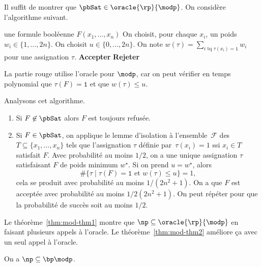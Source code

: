 \documentclass[./main]{subfiles}
\begin{document}
  \hspace{12pt}

  \begin{prv}
    Il suffit de montrer que $\pbSat \in \oracle{\rp}{\modp}$.
    On considère l'algorithme suivant.

    \begin{algorithmic}[1]
      \Require une formule booléenne $F(x_1, \ldots, x_n)$
      \State On choisit, pour chaque $x_i$, un poids $w_i \in \{1, \ldots, 2n\}$.
      \State On choisit $u \in \{0, \ldots, 2n\}$.
      \State On note $w(\tau) = \sum_{i \text{ tq } \tau(x_i) = \texttt{1}} w_i$ pour une assignation $\tau$.
      \BeginBox[draw=nicered]
      \State \textbf{Accepter}
      \Else
      \State \textbf{Rejeter}
      \EndIf
      \EndBox
    \end{algorithmic}
    La partie rouge utilise l'oracle pour $\modp$, car on peut vérifier en temps polynomial que $\tau(F) = \texttt{1}$ et que $w(\tau) \le u$.

    Analysons cet algorithme.
    \begin{enumerate}
      \item Si $F \not\in \pbSat$ alors $F$ est toujours refusée.
      \item Si  $F \in \pbSat$, on applique le lemme d'isolation à l'ensemble~$\mathcal{F}$ des $T \subseteq \{x_1, \ldots, x_n\}$ tels que l'assignation $\tau$ définie par~$\tau(x_i) = 1$ ssi $x_i \in T$ satisfait $F$.
        Avec probabilité au moins  $1 / 2$, on a une unique assignation $\tau$ satisfaisant $F$ de poids minimum $w^\star$.
        Si on prend $u = w^\star$, alors 
         \[
        \# \{\tau  \mid \tau(F) = \texttt{1} \text{ et } w(\tau) \le u\}  = 1
        ,\] 
        cela se produit avec probabilité au moins $1 / (2n^2 + 1)$.
        On a que $F$ est acceptée avec probabilité au moins $1 / 2 (2n^2 + 1)$.
        On peut répéter pour que la probabilité de succès soit au moins $1 / 2$.
    \end{enumerate}
  \end{prv}

  Le théorème~\ref{thm:mod-thm1} montre que $\np \subseteq \oracle{\rp}{\modp}$ en faisant plusieurs appels à l'oracle. Le théorème~\ref{thm:mod-thm2} améliore ça avec un seul appel à l'oracle.

  \begin{thm}
    On a $\np \subseteq \bp\modp$.
    \label{thm:mod-thm2}
  \end{thm}
\end{document}
